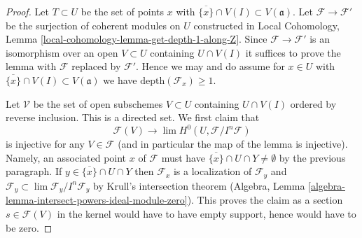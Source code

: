 \begin{proof}
Let $T \subset U$ be the set of points $x$ with
$\overline{\{x\}} \cap V(I) \subset V(\mathfrak a)$.
Let $\mathcal{F} \to \mathcal{F}'$ be the surjection
of coherent modules on $U$ constructed in
Local Cohomology, Lemma \ref{local-cohomology-lemma-get-depth-1-along-Z}.
Since $\mathcal{F} \to \mathcal{F}'$ is an isomorphism
over an open $V \subset U$ containing $U \cap V(I)$
it suffices to prove the lemma with $\mathcal{F}$ replaced
by $\mathcal{F}'$. Hence we may and do assume
for $x \in U$ with $\overline{\{x\}} \cap V(I) \subset V(\mathfrak a)$
we have $\text{depth}(\mathcal{F}_x) \geq 1$.

\medskip\noindent
Let $\mathcal{V}$ be the set of open subschemes $V \subset U$
containing $U \cap V(I)$ ordered by reverse inclusion.
This is a directed set. We first claim that
$$
\mathcal{F}(V)
\longrightarrow
\lim H^0(U, \mathcal{F}/I^n\mathcal{F})
$$
is injective for any $V \in \mathcal{F}$ (and in particular the map
of the lemma is injective). Namely, an associated point $x$ of $\mathcal{F}$
must have $\overline{\{x\}} \cap U \cap Y \not = \emptyset$
by the previous paragraph. If $y \in \overline{\{x\}} \cap U \cap Y$ then
$\mathcal{F}_x$ is a localization of $\mathcal{F}_y$
and $\mathcal{F}_y \subset \lim \mathcal{F}_y/I^n \mathcal{F}_y$
by Krull's intersection theorem
(Algebra, Lemma \ref{algebra-lemma-intersect-powers-ideal-module-zero}).
This proves the claim as a section $s \in \mathcal{F}(V)$
in the kernel would have to have empty support, hence would have to be zero.


\end{proof}
